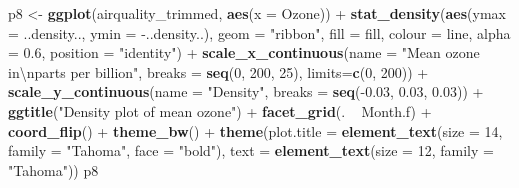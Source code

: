 \documentclass[]{article}
\newenvironment{Shaded}{\begin{snugshade}}{\end{snugshade}}
\newcommand{\KeywordTok}[1]{\textcolor[rgb]{0.13,0.29,0.53}{\textbf{{#1}}}}
\newcommand{\DataTypeTok}[1]{\textcolor[rgb]{0.13,0.29,0.53}{{#1}}}
\newcommand{\DecValTok}[1]{\textcolor[rgb]{0.00,0.00,0.81}{{#1}}}
\newcommand{\FloatTok}[1]{\textcolor[rgb]{0.00,0.00,0.81}{{#1}}}
\newcommand{\CharTok}[1]{\textcolor[rgb]{0.31,0.60,0.02}{{#1}}}
\newcommand{\StringTok}[1]{\textcolor[rgb]{0.31,0.60,0.02}{{#1}}}
\newcommand{\NormalTok}[1]{{#1}}
\begin{document}
\begin{Shaded}
\begin{Highlighting}[]
\NormalTok{p8 <-}\StringTok{ }\KeywordTok{ggplot}\NormalTok{(airquality_trimmed, }\KeywordTok{aes}\NormalTok{(}\DataTypeTok{x =} \NormalTok{Ozone)) +}\StringTok{ }
\StringTok{      }\KeywordTok{stat_density}\NormalTok{(}\KeywordTok{aes}\NormalTok{(}\DataTypeTok{ymax =} \NormalTok{..density..,  }\DataTypeTok{ymin =} \NormalTok{-..density..),}
                   \DataTypeTok{geom =} \StringTok{"ribbon"}\NormalTok{, }
                   \DataTypeTok{fill =} \NormalTok{fill, }\DataTypeTok{colour =} \NormalTok{line, }\DataTypeTok{alpha =} \FloatTok{0.6}\NormalTok{,}
                   \DataTypeTok{position =} \StringTok{"identity"}\NormalTok{) +}
\StringTok{      }\KeywordTok{scale_x_continuous}\NormalTok{(}\DataTypeTok{name =} \StringTok{"Mean ozone in}\CharTok{\textbackslash{}n}\StringTok{parts per billion"}\NormalTok{,}
                         \DataTypeTok{breaks =} \KeywordTok{seq}\NormalTok{(}\DecValTok{0}\NormalTok{, }\DecValTok{200}\NormalTok{, }\DecValTok{25}\NormalTok{),}
                         \DataTypeTok{limits=}\KeywordTok{c}\NormalTok{(}\DecValTok{0}\NormalTok{, }\DecValTok{200}\NormalTok{)) +}
\StringTok{      }\KeywordTok{scale_y_continuous}\NormalTok{(}\DataTypeTok{name =} \StringTok{"Density"}\NormalTok{,}
                         \DataTypeTok{breaks =} \KeywordTok{seq}\NormalTok{(-}\FloatTok{0.03}\NormalTok{, }\FloatTok{0.03}\NormalTok{, }\FloatTok{0.03}\NormalTok{)) +}
\StringTok{      }\KeywordTok{ggtitle}\NormalTok{(}\StringTok{"Density plot of mean ozone"}\NormalTok{) +}
\StringTok{      }\KeywordTok{facet_grid}\NormalTok{(. ~}\StringTok{ }\NormalTok{Month.f) +}
\StringTok{      }\KeywordTok{coord_flip}\NormalTok{() +}
\StringTok{      }\KeywordTok{theme_bw}\NormalTok{() +}
\StringTok{      }\KeywordTok{theme}\NormalTok{(}\DataTypeTok{plot.title =} \KeywordTok{element_text}\NormalTok{(}\DataTypeTok{size =} \DecValTok{14}\NormalTok{, }\DataTypeTok{family =} \StringTok{"Tahoma"}\NormalTok{, }\DataTypeTok{face =} \StringTok{"bold"}\NormalTok{), }
            \DataTypeTok{text =} \KeywordTok{element_text}\NormalTok{(}\DataTypeTok{size =} \DecValTok{12}\NormalTok{, }\DataTypeTok{family =} \StringTok{"Tahoma"}\NormalTok{))}
\NormalTok{p8}
\end{Highlighting}
\end{Shaded}
\end{document}
